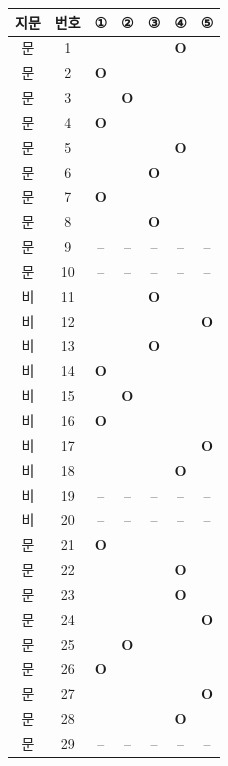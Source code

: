 \documentclass[10pt, a4paper]{article}
\begin{document}
\begin{tabularx}{\textwidth}{|c|c|c|c|c|c|c|}
\hline
\textbf{지문} & \textbf{번호} & ① & ② & ③ & ④ & ⑤ \\
\hline
[1]문 & 1 &  &  &  & \textbf{O} &  \\
\hline
[1]문 & 2 & \textbf{O} &  &  &  &  \\
\hline
[1]문 & 3 &  & \textbf{O} &  &  &  \\
\hline
[1]문 & 4 & \textbf{O} &  &  &  &  \\
\hline
[1]문 & 5 &  &  &  & \textbf{O} &  \\
\hline
[1]문 & 6 &  &  & \textbf{O} &  &  \\
\hline
[1]문 & 7 & \textbf{O} &  &  &  &  \\
\hline
[1]문 & 8 &  &  & \textbf{O} &  &  \\
\hline
[1]문 & 9 & -- & -- & -- & -- & -- \\
\hline
[1]문 & 10 & -- & -- & -- & -- & -- \\
\hline
[2]비 & 11 &  &  & \textbf{O} &  &  \\
\hline
[2]비 & 12 &  &  &  &  & \textbf{O} \\
\hline
[2]비 & 13 &  &  & \textbf{O} &  &  \\
\hline
[2]비 & 14 & \textbf{O} &  &  &  &  \\
\hline
[2]비 & 15 &  & \textbf{O} &  &  &  \\
\hline
[2]비 & 16 & \textbf{O} &  &  &  &  \\
\hline
[2]비 & 17 &  &  &  &  & \textbf{O} \\
\hline
[2]비 & 18 &  &  &  & \textbf{O} &  \\
\hline
[2]비 & 19 & -- & -- & -- & -- & -- \\
\hline
[2]비 & 20 & -- & -- & -- & -- & -- \\
\hline
[3]문 & 21 & \textbf{O} &  &  &  &  \\
\hline
[3]문 & 22 &  &  &  & \textbf{O} &  \\
\hline
[3]문 & 23 &  &  &  & \textbf{O} &  \\
\hline
[3]문 & 24 &  &  &  &  & \textbf{O} \\
\hline
[3]문 & 25 &  & \textbf{O} &  &  &  \\
\hline
[3]문 & 26 & \textbf{O} &  &  &  &  \\
\hline
[3]문 & 27 &  &  &  &  & \textbf{O} \\
\hline
[3]문 & 28 &  &  &  & \textbf{O} &  \\
\hline
[3]문 & 29 & -- & -- & -- & -- & -- \\

\end{tabularx}
\end{document}

